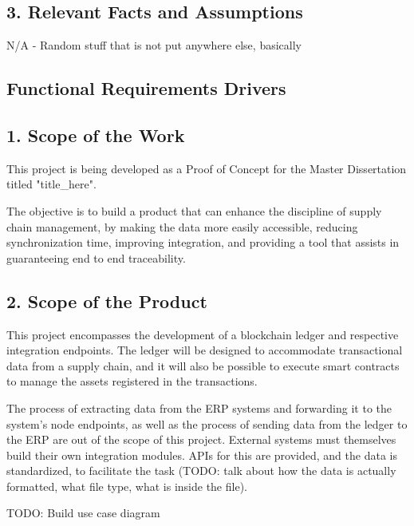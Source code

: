         \subsection*{3. Relevant Facts and Assumptions}
		\par N/A - Random stuff that is not put anywhere else, basically
	

\subsection{Functional Requirements Drivers}
\subsection*{1. Scope of the Work}
		\par This project is being developed as a Proof of Concept for the Master Dissertation titled "title\_here".
		\par The objective is to build a product that can enhance the discipline of supply chain management, by making the data more easily accessible, reducing synchronization time, improving integration, and providing a tool that assists in guaranteeing end to end traceability.
\subsection*{2. Scope of the Product}
		\par This project encompasses the development of a blockchain ledger and respective integration endpoints. The ledger will be designed to accommodate transactional data from a supply chain, and it will also be possible to execute smart contracts to manage the assets registered in the transactions.
		\par The process of extracting data from the ERP systems and forwarding it to the system's node endpoints, as well as the process of sending data from the ledger to the ERP are out of the scope of this project. External systems must themselves build their own integration modules. APIs for this are provided, and the data is standardized, to facilitate the task (TODO: talk about how the data is actually formatted, what file type, what is inside the file).
		\par TODO: Build use case diagram
	
